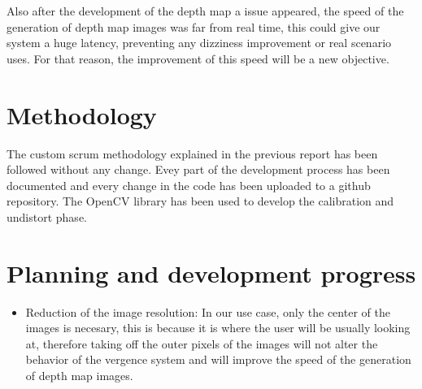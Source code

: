 \documentclass[10pt,a4paper,twocolumn,twoside]{article}
\begin{document}
Also after the development of the depth map a issue appeared, the speed of the generation of depth map images was far from real time, this could give our system a huge latency, preventing any dizziness improvement or real scenario uses. For that reason, the improvement of this speed will be a new objective.


\section{Methodology}
The custom scrum methodology explained in the previous report has been followed without any change. Evey part of the development process has been documented and every change in the code has been uploaded to a github repository. The OpenCV \cite{web:opencv} library has been used to develop the calibration and undistort phase. 


\section{Planning and development progress}
\label{sec:planning}

%
%
% 

\begin{itemize}
	\item Reduction of the image resolution: In our use case, only the center of the images is necesary, this is because it is where the user will be usually looking at, therefore taking off the outer pixels of the images will not alter the behavior of the vergence system and will improve the speed of the generation of depth map images.
\end{itemize}
\end{document}
